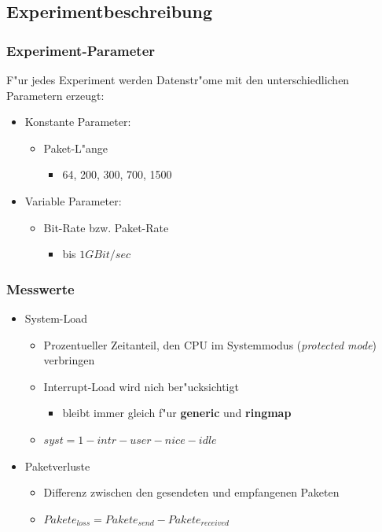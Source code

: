 \documentclass{beamer}
\begin{document}
\subsection*{Experimentbeschreibung}

\begin{frame}
\frametitle{Experiment-Parameter}
F"ur jedes Experiment werden Datenstr"ome mit den unterschiedlichen Parametern  erzeugt: 
\begin{itemize}
	\item Konstante Parameter: 
		\begin{itemize}
			\item Paket-L"ange
				\begin{itemize}
					\item 64, 200, 300, 700, 1500
				\end{itemize}
		\end{itemize}
	\item Variable Parameter: 
		\begin{itemize}
			\item Bit-Rate bzw. Paket-Rate
				\begin{itemize}
					\item bis $1GBit/sec$
				\end{itemize}
		\end{itemize}
\end{itemize}

\end{frame}

\begin{frame}
\frametitle{Messwerte}
\begin{itemize}
	\item System-Load
		\begin{itemize}
			\item Prozentueller Zeitanteil, den CPU im Systemmodus (\emph{protected mode}) verbringen
			\item Interrupt-Load wird nich ber"ucksichtigt
				\begin{itemize}
					\item bleibt immer gleich f"ur \textbf{generic} und \textbf{ringmap}
				\end{itemize}
			\item $syst = 1 - intr - user - nice - idle$\newline
		\end{itemize}
	\item Paketverluste 
		\begin{itemize}
			\item Differenz zwischen den gesendeten und empfangenen Paketen
			\item $Pakete_{loss} = Pakete_{send} - Pakete_{received}$
		\end{itemize}
\end{itemize}
\end{frame}
\end{document}
